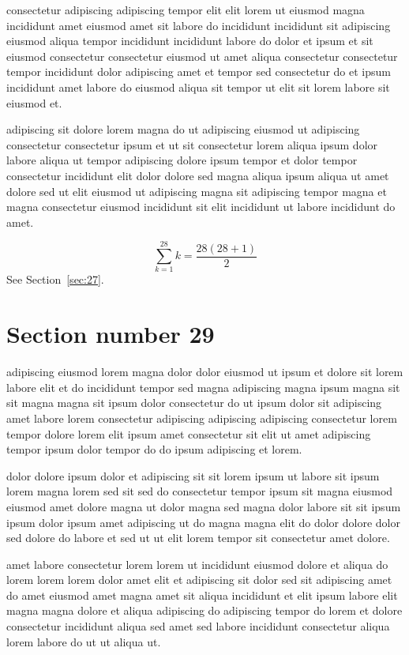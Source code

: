 \documentclass{article}
\begin{document}
consectetur adipiscing adipiscing tempor elit elit lorem ut eiusmod magna incididunt amet eiusmod amet sit labore do incididunt incididunt sit adipiscing eiusmod aliqua tempor incididunt incididunt labore do dolor et ipsum et sit eiusmod consectetur consectetur eiusmod ut amet aliqua consectetur consectetur tempor incididunt dolor adipiscing amet et tempor sed consectetur do et ipsum incididunt amet labore do eiusmod aliqua sit tempor ut elit sit lorem labore sit eiusmod et.

adipiscing sit dolore lorem magna do ut adipiscing eiusmod ut adipiscing consectetur consectetur ipsum et ut sit consectetur lorem aliqua ipsum dolor labore aliqua ut tempor adipiscing dolore ipsum tempor et dolor tempor consectetur incididunt elit dolor dolore sed magna aliqua ipsum aliqua ut amet dolore sed ut elit eiusmod ut adipiscing magna sit adipiscing tempor magna et magna consectetur eiusmod incididunt sit elit incididunt ut labore incididunt do amet.

\begin{equation} \sum_{k=1}^{28} k = \frac{28(28+1)}{2} \end{equation}
See Section~\ref{sec:27}.

\section{Section number 29}\label{sec:29}
adipiscing eiusmod lorem magna dolor dolor eiusmod ut ipsum et dolore sit lorem labore elit et do incididunt tempor sed magna adipiscing magna ipsum magna sit sit magna magna sit ipsum dolor consectetur do ut ipsum dolor sit adipiscing amet labore lorem consectetur adipiscing adipiscing adipiscing consectetur lorem tempor dolore lorem elit ipsum amet consectetur sit elit ut amet adipiscing tempor ipsum dolor tempor do do ipsum adipiscing et lorem.

dolor dolore ipsum dolor et adipiscing sit sit lorem ipsum ut labore sit ipsum lorem magna lorem sed sit sed do consectetur tempor ipsum sit magna eiusmod eiusmod amet dolore magna ut dolor magna sed magna dolor labore sit sit ipsum ipsum dolor ipsum amet adipiscing ut do magna magna elit do dolor dolore dolor sed dolore do labore et sed ut ut elit lorem tempor sit consectetur amet dolore.

amet labore consectetur lorem lorem ut incididunt eiusmod dolore et aliqua do lorem lorem lorem dolor amet elit et adipiscing sit dolor sed sit adipiscing amet do amet eiusmod amet magna amet sit aliqua incididunt et elit ipsum labore elit magna magna dolore et aliqua adipiscing do adipiscing tempor do lorem et dolore consectetur incididunt aliqua sed amet sed labore incididunt consectetur aliqua lorem labore do ut ut aliqua ut.
\end{document}
